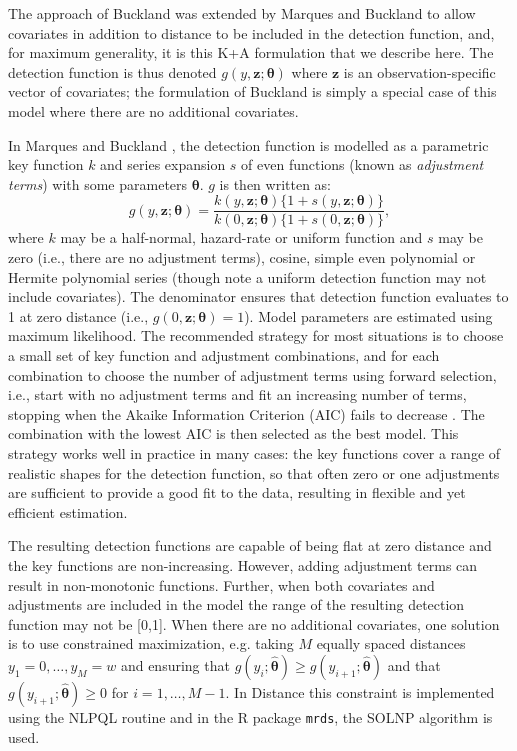 \documentclass[10pt]{article}
\begin{document}
The approach of Buckland \cite{Buckland:1992wy} was extended by Marques and Buckland \cite{Marques:2003vb} to allow covariates in addition to distance to be included in the detection function, and, for maximum generality, it is this K+A formulation that we describe here.  The detection function is thus denoted $g(y, \mathbf{z};\boldsymbol{\theta})$ where $\mathbf{z}$ is an observation-specific vector of covariates; the formulation of Buckland \cite{Buckland:1992wy} is simply a special case of this model where there are no additional covariates. 

In Marques and Buckland \cite{Marques:2003vb}, the detection function is modelled as a parametric key function $k$ and series expansion $s$ of even functions (known as \textit{adjustment terms}) with some parameters $\boldsymbol{\theta}$. $g$ is then written as:
\begin{equation*}
g(y, \mathbf{z}; \boldsymbol{\theta}) = \frac{k(y, \mathbf{z}; \boldsymbol{\theta}) \{1+s(y, \mathbf{z}; \boldsymbol{\theta})\}}{k(0, \mathbf{z}; \boldsymbol{\theta}) \{1+s(0, \mathbf{z}; \boldsymbol{\theta})\}},
\end{equation*}
where $k$ may be a half-normal, hazard-rate or uniform function and $s$ may be zero (i.e., there are no adjustment terms), cosine, simple even polynomial or Hermite polynomial series (though note a uniform detection function may not include covariates). The denominator ensures that detection function evaluates to 1 at zero distance (i.e., $g(0, \mathbf{z};\boldsymbol{\theta})=1$). Model parameters are estimated using maximum likelihood.  The recommended strategy for most situations is to choose a small set of key function and adjustment combinations, and for each combination to choose the number of adjustment terms using forward selection, i.e., start with no adjustment terms and fit an increasing number of terms, stopping when the Akaike Information Criterion (AIC) fails to decrease \cite{Thomas:2010cf}. The combination with the lowest AIC is then selected as the best model. This strategy works well in practice in many cases: the key functions cover a range of realistic shapes for the detection function, so that often zero or one adjustments are sufficient to provide a good fit to the data, resulting in flexible and yet efficient estimation. 

The resulting detection functions are capable of being flat at zero distance and the key functions are non-increasing. However, adding adjustment terms can result in non-monotonic functions. Further, when both covariates and adjustments are included in the model the range of the resulting detection function may not be [0,1]. When there are no additional covariates, one solution is to use constrained maximization, e.g. taking $M$ equally spaced distances $y_1=0, \ldots , y_{M}=w$ and ensuring that $g(y_i;\boldsymbol{\hat{\theta}})\geq g(y_{i+1}; \boldsymbol{\hat{\theta}})$ and that $g(y_{i+1};\boldsymbol{\hat{\theta}})\geq 0$ for $i=1,\ldots,M-1$. In Distance this constraint is implemented using the NLPQL routine \cite{Schittkowski:1986wj} and in the \textsf{R} package \texttt{mrds}, the SOLNP algorithm \cite{Ye:1987wt} is used.
\end{document}
